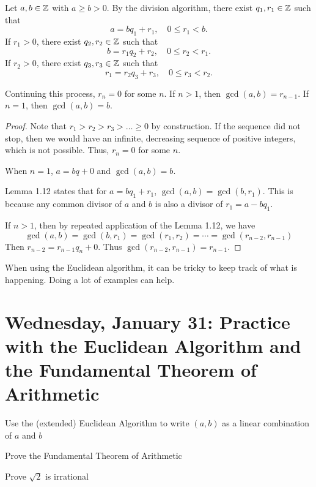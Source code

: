 \documentclass{ximera}
\begin{document}
\begin{thm*} 
	Let $a,b\in\mathbb Z$ with $a\geq b>0$. By the division algorithm, there exist $q_1,r_1\in\mathbb Z$ such that 
	\[a=b q_1+r_1,\quad 0\leq r_1<b.\]
	If $r_1>0$, there exist $q_2,r_2\in\mathbb Z$ such that 
	\[b=r_1 q_2+r_2,\quad 0\leq r_2<r_1.\]
	If $r_2>0$, there exist $q_3,r_3\in\mathbb Z$ such that 
	\[r_1=r_2 q_3+r_3,\quad 0\leq r_3<r_2.\]
	
	Continuing this process, $r_n=0$ for some $n$. If $n>1$, then $\gcd(a,b)=r_{n-1}$. If $n=1$, then $\gcd(a,b)=b$.
	\end{thm*}
	\begin{proof}
	 Note that $r_1>r_2>r_3>\dots\geq0$ by construction. If the sequence did not stop, then we would have an infinite, decreasing sequence of positive integers, which is not possible. Thus, $r_n=0$ for some $n$. 
	 
	 When $n=1$, $a=bq+0$ and $\gcd(a,b)=b$.
	 
	 Lemma 1.12 states that for $a=bq_1+r_1$, $\gcd(a,b)=\gcd(b,r_1)$. This is because any common divisor of $a$ and $b$  is also a divisor of $r_1=a-bq_1$. 
	 
	 If $n>1$, then by repeated application of the Lemma 1.12, we have 
	 \[\gcd(a,b)=\gcd(b,r_1)=\gcd(r_1,r_2)=\cdots=\gcd(r_{n-2},r_{n-1})\]
	 Then $r_{n-2}=r_{n-1} q_n+0$. Thus $\gcd(r_{n-2},r_{n-1})=r_{n-1}$.
	\end{proof}
	
	When using the Euclidean algorithm, it can be tricky to keep track of what is happening. Doing a lot of examples can help.
	
\section{Wednesday, January 31: Practice with the Euclidean Algorithm and the Fundamental Theorem of Arithmetic}

\begin{obj}
\item  Use the (extended) Euclidean Algorithm to write $(a,b)$ as a linear combination of $a$ and $b$
\item Prove the Fundamental Theorem of Arithmetic
\item  Prove $\sqrt{2}$ is irrational
\end{obj}
\end{document}
